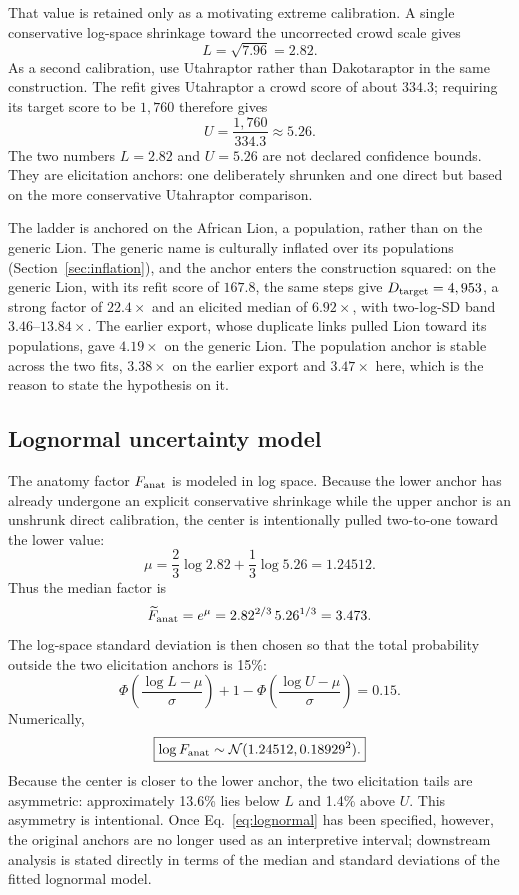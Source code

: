 \documentclass[11pt]{article}
\begin{document}
That value is retained only as a motivating extreme calibration. A single conservative log-space shrinkage toward the uncorrected crowd scale gives
\[
L=\sqrt{7.96}=2.82.
\]
As a second calibration, use Utahraptor rather than Dakotaraptor in the same construction. The refit gives Utahraptor a crowd score of about $334.3$; requiring its target score to be $1,760$ therefore gives
\[
U=\frac{1,760}{334.3}\approx5.26.
\]
The two numbers $L=2.82$ and $U=5.26$ are not declared confidence bounds. They are elicitation anchors: one deliberately shrunken and one direct but based on the more conservative Utahraptor comparison.

The ladder is anchored on the African Lion, a population, rather than on the generic Lion. The generic name is culturally inflated over its populations (Section~\ref{sec:inflation}), and the anchor enters the construction squared: on the generic Lion, with its refit score of $167.8$, the same steps give $D_{\rm target}=4,953$, a strong factor of $22.4\times$ and an elicited median of $6.92\times$, with two-log-SD band $3.46$--$13.84\times$. The earlier export, whose duplicate links pulled Lion toward its populations, gave $4.19\times$ on the generic Lion. The population anchor is stable across the two fits, $3.38\times$ on the earlier export and $3.47\times$ here, which is the reason to state the hypothesis on it.

\subsection{Lognormal uncertainty model}
The anatomy factor $F_{\rm anat}$ is modeled in log space. Because the lower anchor has already undergone an explicit conservative shrinkage while the upper anchor is an unshrunk direct calibration, the center is intentionally pulled two-to-one toward the lower value:
\begin{equation}
\mu=\frac{2}{3}\log 2.82+\frac{1}{3}\log 5.26=1.24512.
\end{equation}
Thus the median factor is
\begin{equation}
\widetilde F_{\rm anat}=e^\mu=2.82^{2/3}\,5.26^{1/3}=3.473.
\end{equation}
The log-space standard deviation is then chosen so that the total probability outside the two elicitation anchors is 15\%:
\begin{equation}
\Phi\!\left(\frac{\log L-\mu}{\sigma}\right)
+1-\Phi\!\left(\frac{\log U-\mu}{\sigma}\right)=0.15.
\end{equation}
Numerically,
\begin{equation}
\boxed{\log F_{\rm anat}\sim\mathcal N(1.24512,0.18929^2).}
\label{eq:lognormal}
\end{equation}
Because the center is closer to the lower anchor, the two elicitation tails are asymmetric: approximately 13.6\% lies below $L$ and 1.4\% above $U$. This asymmetry is intentional. Once Eq.~\eqref{eq:lognormal} has been specified, however, the original anchors are no longer used as an interpretive interval; downstream analysis is stated directly in terms of the median and standard deviations of the fitted lognormal model.
\end{document}

